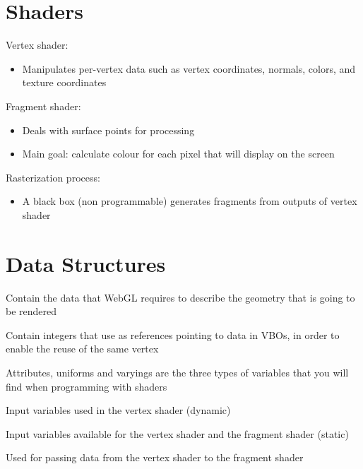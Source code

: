 \documentclass{article}[18pt]
\begin{document}
\section{Shaders}
Vertex shader:
\begin{itemize}
	\item Manipulates per-vertex data such as vertex coordinates, normals, colors, and texture coordinates
\end{itemize}
Fragment shader:
\begin{itemize}
	\item Deals with surface points for processing
	\item Main goal: calculate colour for each pixel that will display on the screen
\end{itemize}
Rasterization process:
\begin{itemize}
	\item A black box (non programmable) generates fragments from outputs of vertex shader
\end{itemize}
\section{Data Structures}
\begin{definition}
Contain the data that WebGL requires to describe the geometry that is going to be rendered
\end{definition}

\begin{definition}
	Contain integers that use as references pointing to data in VBOs, in order to enable the reuse of the same vertex
\end{definition}

Attributes, uniforms and varyings are the three types of variables that you will find when programming with shaders
\begin{definition}[Attributes]
	Input variables used in the vertex shader (dynamic)
\end{definition}

\begin{definition}[Uniforms]
Input variables available for the vertex shader and the fragment shader (static)
\end{definition}

\begin{definition}[Varyings]
Used for passing data from the vertex shader to the fragment shader
\end{definition}
\end{document}
